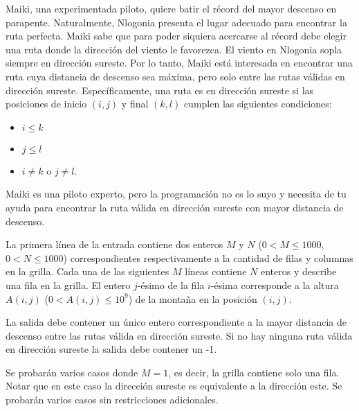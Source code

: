\documentclass{oci}
\begin{document}
\begin{problemDescription}
Maiki, una experimentada piloto, quiere batir el récord del mayor descenso en parapente.
Naturalmente, Nlogonia presenta el lugar adecuado para encontrar la ruta perfecta.
Maiki sabe que para poder siquiera acercarse al récord debe elegir una ruta donde la dirección
del viento le favorezca.
El viento en Nlogonia sopla siempre en dirección sureste.
Por lo tanto, Maiki está interesada en encontrar una ruta cuya distancia de descenso sea máxima,
pero solo entre las rutas válidas en dirección sureste.
Específicamente, una ruta es en dirección sureste si las posiciones de inicio $(i, j)$ y final $(k, l)$
cumplen las siguientes condiciones:
\begin{itemize}
\item $i \le k$
\item $j \le l$
\item $i \ne k$ o $j \ne l$.
\end{itemize}

Maiki es una piloto experto, pero la programación no es lo suyo y necesita de tu ayuda para
encontrar la ruta válida en dirección sureste con mayor distancia de descenso.

\end{problemDescription}

\begin{inputDescription}
La primera línea de la entrada contiene dos enteros $M$ y $N$ ($0 < M \leq 1000$, $0 < N \leq 1000$)
correspondientes respectivamente a la cantidad de filas y columnas en la grilla.
Cada una de las siguientes $M$ líneas contiene $N$ enteros y describe una fila en la grilla.
El entero $j$-ésimo de la fila $i$-ésima corresponde a la altura $A(i,j)$ ($ 0 < A(i, j) \leq 10^9$)
de la montaña en la posición $(i,j)$.
\end{inputDescription}

\begin{outputDescription}
La salida debe contener un único entero correspondiente a la mayor distancia de descenso entre las
rutas válida en dirección sureste.
Si no hay ninguna ruta válida en dirección sureste la salida debe contener un -1.
\end{outputDescription}

\begin{scoreDescription}
  Se probarán varios casos donde $M=1$, es decir, la grilla contiene solo una fila.
  Notar que en este caso la dirección sureste es equivalente a la dirección este.
  Se probarán varios casos sin restricciones adicionales.
\end{scoreDescription}

\begin{sampleDescription}
\end{sampleDescription}
\end{document}
